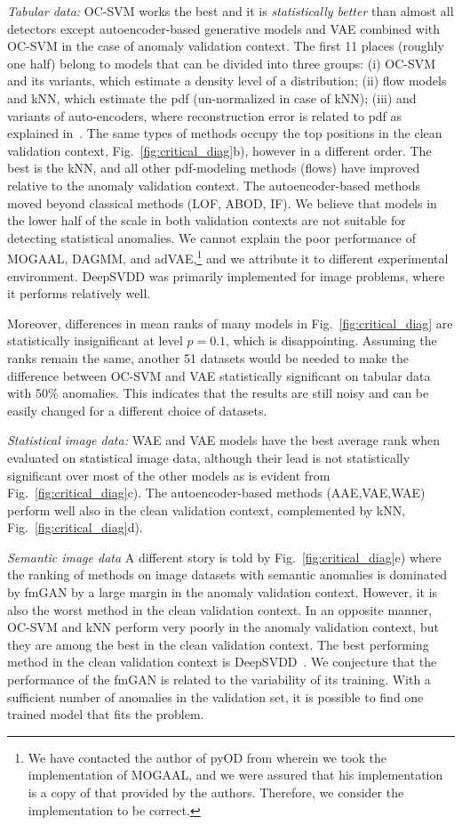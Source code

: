 \emph{Tabular data:} OC-SVM works the best and it is \emph{statistically better} than almost all detectors except autoencoder-based generative models and VAE combined with OC-SVM in the case of anomaly validation context. The first 11 places (roughly one half) belong to models that can be divided into three groups: (i) OC-SVM and its variants, which estimate a density level of a distribution; (ii) flow models and kNN, which estimate the pdf (un-normalized in case of kNN); (iii) and variants of auto-encoders, where reconstruction error is related to pdf as explained in~\cite{vsmidl2019anomaly}. The same types of methods occupy the top positions in the clean validation context, Fig.~\ref{fig:critical_diag}b), however in a different order. The best is the kNN, and all other pdf-modeling methods (flows) have improved relative to the anomaly validation context. The autoencoder-based methods moved beyond classical methods (LOF, ABOD, IF). We believe that models in the lower half of the scale in both validation contexts are not suitable for detecting statistical anomalies. We cannot explain the poor performance of MOGAAL, DAGMM, and adVAE,\footnote{We have contacted the author of pyOD from wherein we took the implementation of MOGAAL, and we were assured that his implementation is a copy of that provided by the authors. Therefore, we consider the implementation to be correct.} and we attribute it to different experimental environment. DeepSVDD was primarily implemented for image problems, where it performs relatively well.

Moreover, differences in mean ranks of many models in Fig.~\ref{fig:critical_diag} are statistically insignificant at level $p=0.1$, which is disappointing. Assuming the ranks remain the same, another 51 datasets would be needed to make the difference between OC-SVM and VAE statistically significant on tabular data with 50\% anomalies. This indicates that the results are still noisy and can be easily changed for a different choice of datasets.

\emph{Statistical image data:} WAE and VAE models have the best average rank when evaluated on statistical image data, although their lead is not statistically significant over most of the other models as is evident from Fig.~\ref{fig:critical_diag}c). The autoencoder-based methods (AAE,VAE,WAE) perform well also in the clean validation context, complemented by kNN, Fig.~\ref{fig:critical_diag}d).

\emph{Semantic image data}
A different story is told by Fig.~\ref{fig:critical_diag}e) where the ranking of methods on image datasets with semantic anomalies is dominated by fmGAN by a large margin in the anomaly validation context. However, it is also the worst method in the clean validation context. In an opposite manner, 
OC-SVM and kNN perform very poorly in the anomaly validation context, but they are among the best in the clean validation context.  The best performing method in the clean validation context is DeepSVDD~\cite{ruff2018deep}. We conjecture that the performance of the fmGAN is related to the variability of its training. With a sufficient number of anomalies in the validation set, it is possible to find one trained model that fits the problem.

